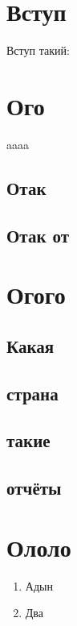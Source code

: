 \tableofcontents

\chapter*{Вступ}
\setcounter{page}{3}
Вступ такий:

\lipsum

\chapter{Ого}
aaaa
\section{Отак}
\section{Отак от}

\chapter{Огого}
\section{Какая}
\lipsum[1]
\section{страна}
\lipsum[2]
\section{такие}
\lipsum[3]
\section{отчёты}
\lipsum[4]

\chapter{Ололо}
\begin{enumerate}
    \item Адын
    \item Два
\end{enumerate}

